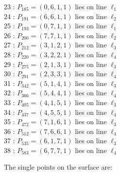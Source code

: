 \documentclass{article}
\begin{document}
{\begin{multicols}{2}
23 : $P_{185}=( 0, 6, 1, 1 )$ lies on line $\ell_{1}$\\
24 : $P_{191}=( 6, 6, 1, 1 )$ lies on line $\ell_{2}$\\
25 : $P_{193}=( 0, 7, 1, 1 )$ lies on line $\ell_{1}$\\
26 : $P_{200}=( 7, 7, 1, 1 )$ lies on line $\ell_{2}$\\
27 : $P_{212}=( 3, 1, 2, 1 )$ lies on line $\ell_{3}$\\
28 : $P_{220}=( 3, 2, 2, 1 )$ lies on line $\ell_{4}$\\
29 : $P_{275}=( 2, 1, 3, 1 )$ lies on line $\ell_{3}$\\
30 : $P_{291}=( 2, 3, 3, 1 )$ lies on line $\ell_{4}$\\
31 : $P_{342}=( 5, 1, 4, 1 )$ lies on line $\ell_{3}$\\
32 : $P_{366}=( 5, 4, 4, 1 )$ lies on line $\ell_{4}$\\
33 : $P_{405}=( 4, 1, 5, 1 )$ lies on line $\ell_{3}$\\
34 : $P_{437}=( 4, 5, 5, 1 )$ lies on line $\ell_{4}$\\
35 : $P_{472}=( 7, 1, 6, 1 )$ lies on line $\ell_{3}$\\
36 : $P_{512}=( 7, 6, 6, 1 )$ lies on line $\ell_{4}$\\
37 : $P_{535}=( 6, 1, 7, 1 )$ lies on line $\ell_{3}$\\
38 : $P_{583}=( 6, 7, 7, 1 )$ lies on line $\ell_{4}$\\
\end{multicols}
The single points on the surface are:\\
}
\end{document}

